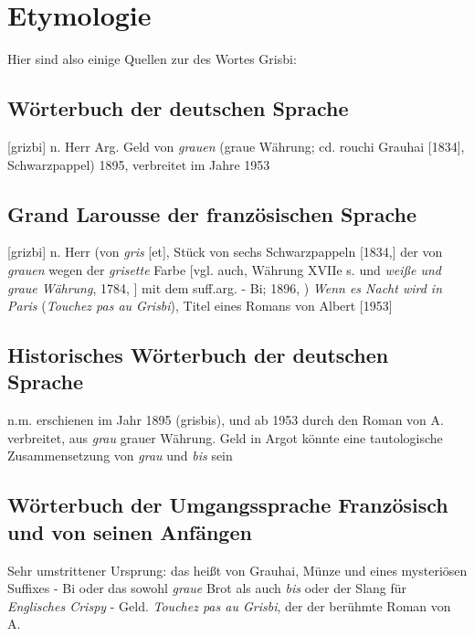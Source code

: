 \section{Etymologie\label{preamble-etymology}}

Hier sind also einige Quellen zur  des Wortes Grisbi:

\subsection*{Wörterbuch der deutschen Sprache}
[grizbi] n. Herr Arg. Geld von \emph{grauen} (graue Währung; cd. rouchi Grauhai [1834], \glqq{}Schwarzpappel\glqq{}) 1895, verbreitet im Jahre 1953

\subsection*{Grand Larousse der französischen Sprache}
[grizbi] n. Herr (von \emph{gris} [et], Stück von sechs Schwarzpappeln [1834,] der von \emph{grauen} wegen der \emph{grisette} Farbe [vgl. auch, \glqq{}Währung\grqq{} XVIIe s. und \emph{weiße und graue Währung}, 1784, ] mit dem suff.arg. - Bi; 1896, )
\emph{Wenn es Nacht wird in Paris} (\emph{Touchez pas au Grisbi}), Titel eines Romans von Albert  [1953]

\subsection*{Historisches Wörterbuch der deutschen Sprache}
n.m. erschienen im Jahr 1895 (grisbis), und ab 1953 durch den Roman von A.  verbreitet, aus \emph{grau} \glqq{}grauer Währung\grqq{}. \glqq{}Geld\grqq{} in Argot könnte eine tautologische Zusammensetzung von \emph{grau} und \emph{bis} sein

\subsection*{Wörterbuch der Umgangssprache Französisch und von seinen Anfängen}
Sehr umstrittener Ursprung: das heißt von Grauhai, \glqq{}Münze\grqq{} und eines mysteriösen Suffixes - Bi oder das sowohl \emph{graue} Brot als auch \emph{bis} oder der Slang für \glqq{}\emph{Englisches Crispy} - Geld\grqq{}. \emph{Touchez pas au Grisbi}, der der berühmte Roman von A. 

